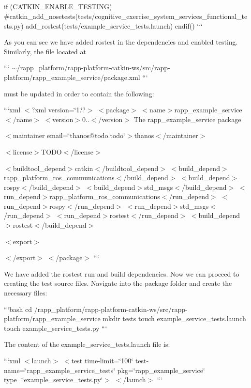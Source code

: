 \subparagraph*{}

if (C\-A\-T\-K\-I\-N\-\_\-\-E\-N\-A\-B\-L\-E\-\_\-\-T\-E\-S\-T\-I\-N\-G) \#catkin\-\_\-add\-\_\-nosetests(tests/cognitive\-\_\-exercise\-\_\-system\-\_\-services\-\_\-functional\-\_\-tests.\-py) add\-\_\-rostest(tests/example\-\_\-service\-\_\-tests.\-launch) endif() ```

As you can see we have added rostest in the dependencies and enabled testing. Similarly, the file located at

``` $\sim$/rapp\-\_\-platform/rapp-\/platform-\/catkin-\/ws/src/rapp-\/platform/rapp\-\_\-example\-\_\-service/package.xml ```

must be updated in order to contain the following\-:

```xml $<$?xml version=\char`\"{}1.\char`\"{}?$>$ $<$package$>$ $<$name$>$rapp\-\_\-example\-\_\-service$<$/name$>$ $<$version$>$0..$<$/version$>$ The rapp\-\_\-example\-\_\-service package

$<$maintainer email=\char`\"{}thanos@todo.\-todo\char`\"{}$>$thanos$<$/maintainer$>$

$<$license$>$T\-O\-D\-O$<$/license$>$

$<$buildtool\-\_\-depend$>$catkin$<$/buildtool\-\_\-depend$>$ $<$build\-\_\-depend$>$rapp\-\_\-platform\-\_\-ros\-\_\-communications$<$/build\-\_\-depend$>$ $<$build\-\_\-depend$>$rospy$<$/build\-\_\-depend$>$ $<$build\-\_\-depend$>$std\-\_\-msgs$<$/build\-\_\-depend$>$ $<$run\-\_\-depend$>$rapp\-\_\-platform\-\_\-ros\-\_\-communications$<$/run\-\_\-depend$>$ $<$run\-\_\-depend$>$rospy$<$/run\-\_\-depend$>$ $<$run\-\_\-depend$>$std\-\_\-msgs$<$/run\-\_\-depend$>$ $<$run\-\_\-depend$>$rostest$<$/run\-\_\-depend$>$ $<$build\-\_\-depend$>$rostest$<$/build\-\_\-depend$>$

$<$export$>$

$<$/export$>$ $<$/package$>$ ```

We have added the rostest run and build dependencies. Now we can proceed to creating the test source files. Navigate into the package folder and create the necessary files\-:

```bash cd /rapp\-\_\-platform/rapp-\/platform-\/catkin-\/ws/src/rapp-\/platform/rapp\-\_\-example\-\_\-service mkdir tests touch example\-\_\-service\-\_\-tests.\-launch touch example\-\_\-service\-\_\-tests.\-py ```

The content of the {\ttfamily example\-\_\-service\-\_\-tests.\-launch} file is\-:

```xml $<$launch$>$    $<$test time-\/limit=\char`\"{}100\char`\"{} test-\/name=\char`\"{}rapp\-\_\-example\-\_\-service\-\_\-tests\char`\"{} pkg=\char`\"{}rapp\-\_\-example\-\_\-service\char`\"{} type=\char`\"{}example\-\_\-service\-\_\-tests.\-py\char`\"{}$>$ $<$/launch$>$ ```

